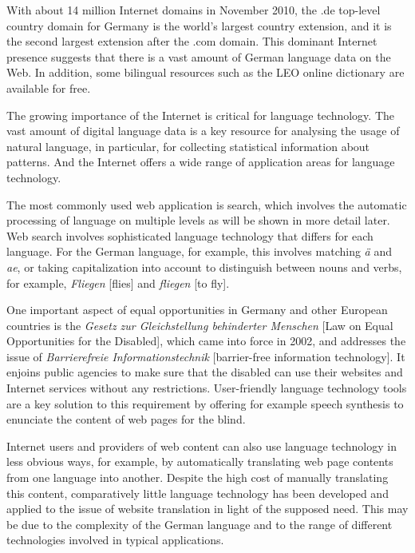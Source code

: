\documentclass[]{../../metanetpaper}
\begin{document}
\begin{Parallel}[c]{80mm}{80mm}
{    With about 14 million Internet domains in November 2010, the .de top-level country domain for Germany is the world’s largest country extension, and it is the second largest extension after the .com domain\cite{denic1}. This dominant Internet presence suggests that there is a vast amount of German language data on the Web. In addition, some bilingual resources such as the LEO online dictionary are available for free\cite{leo1}.

    The growing importance of the Internet is critical for language technology. The vast amount of digital language data is a key resource for analysing the usage of natural language, in particular, for collecting statistical information about patterns. And the Internet offers a wide range of application areas for language technology. 

    The most commonly used web application is search, which involves the automatic processing of language on multiple levels as will be shown in more detail later. Web search involves sophisticated language technology that differs for each language. For the German language, for example, this involves matching \textit{ä} and \textit{ae}, or taking capitalization into account to distinguish between nouns and verbs, for example, \textit{Fliegen} {[}flies{]} and \textit{fliegen} {[}to fly{]}.

    One important aspect of equal opportunities in Germany and other European countries is the \textit{Gesetz zur Gleichstellung behinderter Menschen} {[}Law on Equal Opportunities for the Disabled{]}, which came into force in 2002, and addresses the issue of \textit{Barrierefreie Informationstechnik} {[}barrier-free information technology{]}. It enjoins public agencies to make sure that the disabled can use their websites and Internet services without any restrictions. User-friendly language technology tools are a key solution to this requirement by offering for example speech synthesis to enunciate the content of web pages for the blind.

    Internet users and providers of web content can also use language technology in less obvious ways, for example, by automatically translating web page contents from one language into another. Despite the high cost of manually translating this content, comparatively little language technology has been developed and applied to the issue of website translation in light of the supposed need. This may be due to the complexity of the German language and to the range of different technologies involved in typical applications. 

}
\end{Parallel}
\end{document}
